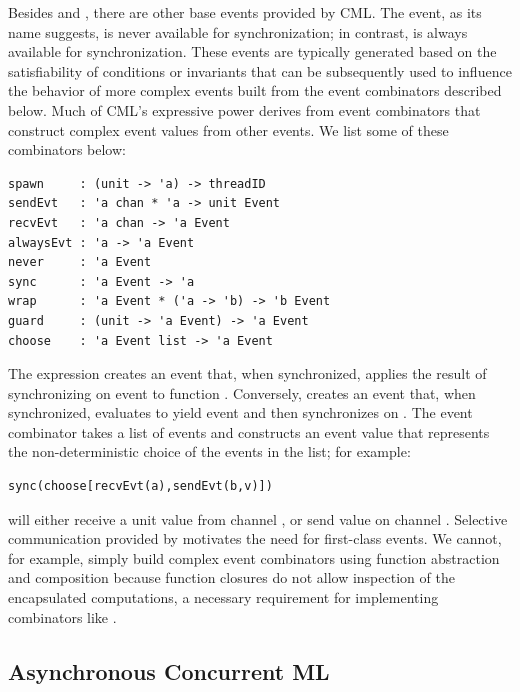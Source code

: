 Besides  and , there are other base events provided by
CML\@.  The  event, as its name suggests, is never available for
synchronization; in contrast,  is always available for
synchronization.  These events are typically generated based on the
satisfiability of conditions or invariants that can be subsequently used to
influence the behavior of more complex events built from the event combinators
described below.  Much of CML's expressive power derives from event combinators
that construct complex event values from other events.  We list some of these
combinators below:
\vspace{5mm}

\lstset{numbers=none}
\begin{lstlisting}
spawn     : (unit -> 'a) -> threadID
sendEvt   : 'a chan * 'a -> unit Event
recvEvt   : 'a chan -> 'a Event
alwaysEvt : 'a -> 'a Event
never     : 'a Event
sync      : 'a Event -> 'a
wrap      : 'a Event * ('a -> 'b) -> 'b Event
guard     : (unit -> 'a Event) -> 'a Event
choose    : 'a Event list -> 'a Event
\end{lstlisting}

The expression  creates an event that, when synchronized,
applies the result of synchronizing on event  to function .
Conversely,  creates an event that, when synchronized, evaluates
 to yield event  and then synchronizes on .  The
 event combinator takes a list of events and constructs an event
value that represents the non-deterministic choice of the events in the list;
for example:

\vspace{3mm}
\lstset{numbers=none}
\begin{lstlisting}
sync(choose[recvEvt(a),sendEvt(b,v)])
\end{lstlisting}

\noindent will either receive a unit value from channel , or send value
 on channel .  Selective communication provided by 
motivates the need for first-class events. We cannot, for example, simply build
complex event combinators using function abstraction and composition because
function closures do not allow inspection of the encapsulated computations, a
necessary requirement for implementing combinators like .

\subsection{Asynchronous Concurrent ML}

